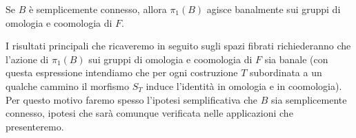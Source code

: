 \begin{corollary}
Se $B$ è semplicemente connesso, allora $\pi_1(B)$ agisce banalmente sui gruppi di omologia e coomologia di $F$.
\end{corollary}

I risultati principali che ricaveremo in seguito sugli spazi fibrati richiederanno che l'azione di $\pi_1(B)$ sui gruppi di omologia e coomologia di $F$ sia banale (con questa espressione intendiamo che per ogni costruzione $T$ subordinata a un qualche cammino il morfismo $S_T$ induce l'identità in omologia e in coomologia). Per questo motivo faremo spesso l'ipotesi semplificativa che $B$ sia semplicemente connesso, ipotesi che sarà comunque verificata nelle applicazioni che presenteremo.